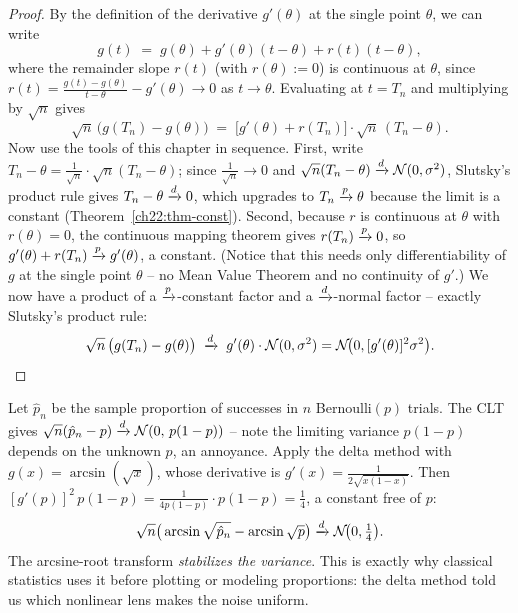 \begin{proof}
By the definition of the derivative $g'(\theta)$ at the single point $\theta$, we can write
\[
  g(t) \;=\; g(\theta) + g'(\theta)(t - \theta) + r(t)(t - \theta),
\]
where the remainder slope $r(t)$ (with $r(\theta) := 0$) is continuous at $\theta$, since
$r(t) = \frac{g(t) - g(\theta)}{t - \theta} - g'(\theta) \to 0$ as $t \to \theta$. Evaluating
at $t = T_n$ and multiplying by $\sqrt{n}$ gives
\[
  \sqrt{n}\,\big(g(T_n) - g(\theta)\big)
  \;=\; \big[g'(\theta) + r(T_n)\big]\cdot \sqrt{n}\,(T_n-\theta).
\]
Now use the tools of this chapter in sequence. First, write
$T_n - \theta = \frac{1}{\sqrt{n}}\cdot \sqrt{n}(T_n - \theta)$; since $\frac{1}{\sqrt{n}} \to 0$
and $\sqrt{n}(T_n-\theta) \xrightarrow{d} \mathcal{N}(0,\sigma^2)$, Slutsky's product rule gives
$T_n - \theta \xrightarrow{d} 0$, which upgrades to $T_n \xrightarrow{p} \theta$ because the limit is a constant
(Theorem~\ref{ch22:thm-const}). Second, because $r$ is continuous at $\theta$ with
$r(\theta) = 0$, the continuous mapping theorem gives $r(T_n) \xrightarrow{p} 0$, so
$g'(\theta) + r(T_n) \xrightarrow{p} g'(\theta)$, a constant. (Notice that this needs only
differentiability of $g$ at the single point $\theta$ -- no Mean Value Theorem and no
continuity of $g'$.) We now have a product of a
$\xrightarrow{p}$-constant factor and a $\xrightarrow{d}$-normal factor -- exactly Slutsky's product rule:
\[
  \sqrt n\,\big(g(T_n)-g(\theta)\big)
  \;\xrightarrow{d}\; g'(\theta)\cdot\mathcal{N}(0,\sigma^2)
  = \mathcal{N}\!\big(0,[g'(\theta)]^2\sigma^2\big).\qedhere
\]
\end{proof}

\begin{example}
\label{ch22:ex-arcsine}
Let $\hat p_n$ be the sample proportion of successes in $n$ Bernoulli$(p)$ trials. The
CLT gives $\sqrt n(\hat p_n - p)\xrightarrow{d}\mathcal{N}(0,\,p(1-p))$ -- note the limiting variance
$p(1-p)$ depends on the unknown $p$, an annoyance. Apply the delta method with
$g(x)=\arcsin(\sqrt x)$, whose derivative is $g'(x)=\frac{1}{2\sqrt{x(1-x)}}$. Then
$[g'(p)]^2\,p(1-p)=\frac{1}{4p(1-p)}\cdot p(1-p)=\frac14$, a constant free of $p$:
\[
  \sqrt n\big(\arcsin\sqrt{\hat p_n}-\arcsin\sqrt p\big)\xrightarrow{d}\mathcal{N}\!\big(0,\tfrac14\big).
\]
The arcsine-root transform \emph{stabilizes the variance}. This is exactly why
classical statistics uses it before plotting or modeling proportions: the delta method
told us which nonlinear lens makes the noise uniform.
\end{example}


